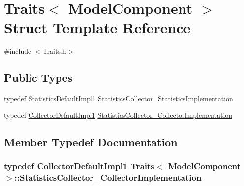 \hypertarget{struct_traits_3_01_model_component_01_4}{}\section{Traits$<$ Model\+Component $>$ Struct Template Reference}
\label{struct_traits_3_01_model_component_01_4}


{\ttfamily \#include $<$Traits.\+h$>$}

\subsection*{Public Types}
\begin{DoxyCompactItemize}
\item 
typedef \hyperlink{class_statistics_default_impl1}{Statistics\+Default\+Impl1} \hyperlink{struct_traits_3_01_model_component_01_4_acf20ecaf5ac469daac2834bebcd95c17}{Statistics\+Collector\+\_\+\+Statistics\+Implementation}
\item 
typedef \hyperlink{class_collector_default_impl1}{Collector\+Default\+Impl1} \hyperlink{struct_traits_3_01_model_component_01_4_ae0f44e4745dff2ffc9d345179eb6e22d}{Statistics\+Collector\+\_\+\+Collector\+Implementation}
\end{DoxyCompactItemize}


\subsection{Member Typedef Documentation}
\subsubsection[{\texorpdfstring{Statistics\+Collector\+\_\+\+Collector\+Implementation}{StatisticsCollector_CollectorImplementation}}]{\setlength{\rightskip}{0pt plus 5cm}typedef {\bf Collector\+Default\+Impl1} {\bf Traits}$<$ {\bf Model\+Component} $>$\+::{\bf Statistics\+Collector\+\_\+\+Collector\+Implementation}}\hypertarget{struct_traits_3_01_model_component_01_4_ae0f44e4745dff2ffc9d345179eb6e22d}{}\label{struct_traits_3_01_model_component_01_4_ae0f44e4745dff2ffc9d345179eb6e22d}
